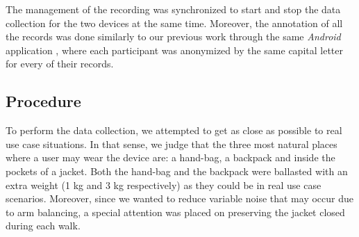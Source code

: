 \documentclass[10pt,conference]{IEEEtran}
\begin{document}


The management of the recording was synchronized to start and stop the data collection for the two devices at the same time. Moreover, the annotation of all the records was done similarly to our previous work through the same \textit{Android} application {\cite{Thullier2017b}}, where each participant was anonymized by the same capital letter for every of their records.


\subsection{Procedure}
To perform the data collection, we attempted to get as close as possible to real use case situations. In that sense, we judge that the three most natural places where a user may wear the device are: a hand-bag, a backpack and inside the pockets of a jacket. Both the hand-bag and the backpack were ballasted with an extra weight (1 kg and 3 kg respectively) as they could be in real use case scenarios. 
Moreover, since we wanted to reduce variable noise that may occur due to arm balancing, a special attention was placed on preserving the jacket closed during each walk.
\end{document}
